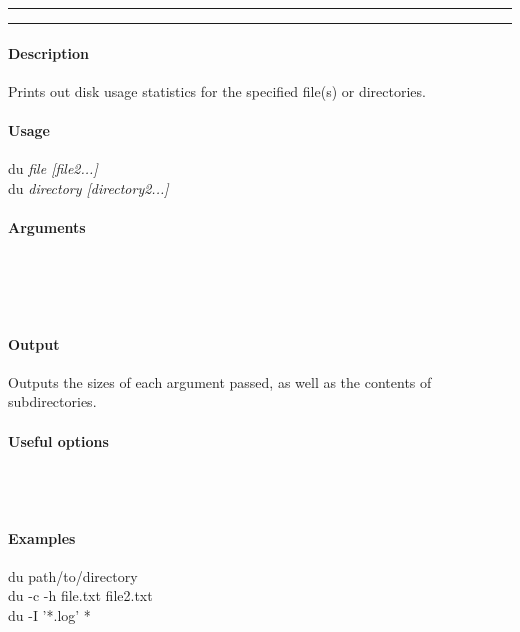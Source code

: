 \hrule
\vspace{1mm}
\hrule
\vspace{4mm}

\paragraph{Description}
\indentpar \raggedright \textrm{Prints out disk usage statistics for the specified file(s) or directories.}\\

\paragraph{Usage}
\indentpar du \textit{file [file2...]}\\
\indentpar du \textit{directory [directory2...]}

\paragraph{Arguments}
\indentpar {}\\
\indentpar {}\\
\indentpar {}\\
\indentpar {}

\paragraph{Output}
\indentpar \textrm{Outputs the sizes of each argument passed, as well as the contents of subdirectories.}

\paragraph{Useful options}
\indentpar {}\\
\indentpar {}\\
\indentpar {}


\paragraph{Examples}

\indentpar du path/to/directory\\
\indentpar du -c -h file.txt file2.txt\\
\indentpar du -I '*.log' *

\vspace{20mm}